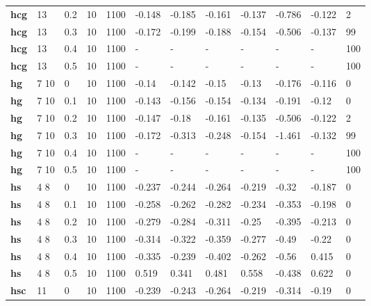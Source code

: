 \begin{longtable}[h]{|p{0.8cm}|p{1.5cm}|p{1cm}|p{1cm}|p{1cm}|p{1cm}|p{1cm}|p{1cm}|p{1cm}|p{1cm}|p{1cm}|p{1.5cm}|}
           \\
  \textbf{hcg } &  13         & 0.2 & 10 & 1100 & -0.148 & -0.185 & -0.161 & -0.137 & -0.786 & -0.122 &   2
           \\
  \textbf{hcg } &  13         & 0.3 & 10 & 1100 & -0.172 & -0.199 & -0.188 & -0.154 & -0.506 & -0.137 &  99
           \\
  \textbf{hcg } &  13         & 0.4 & 10 & 1100 & - & - & - & - & - & - & 100
           \\
  \textbf{hcg } &  13         & 0.5 & 10 & 1100 & - & - & - & - & - & - & 100
           \\
  \textbf{hg  } &  7 10       &   0 & 10 & 1100 &  -0.14 & -0.142 &  -0.15 &  -0.13 & -0.176 & -0.116 &   0
           \\
  \textbf{hg  } &  7 10       & 0.1 & 10 & 1100 & -0.143 & -0.156 & -0.154 & -0.134 & -0.191 &  -0.12 &   0
           \\
  \textbf{hg  } &  7 10       & 0.2 & 10 & 1100 & -0.147 &  -0.18 & -0.161 & -0.135 & -0.506 & -0.122 &   2
           \\
  \textbf{hg  } &  7 10       & 0.3 & 10 & 1100 & -0.172 & -0.313 & -0.248 & -0.154 & -1.461 & -0.132 &  99
           \\
  \textbf{hg  } &  7 10       & 0.4 & 10 & 1100 & - & - & - & - & - & - & 100
           \\
  \textbf{hg  } &  7 10       & 0.5 & 10 & 1100 & - & - & - & - & - & - & 100
           \\
  \textbf{hs  } &  4 8        &   0 & 10 & 1100 & -0.237 & -0.244 & -0.264 & -0.219 &  -0.32 & -0.187 &   0
           \\
  \textbf{hs  } &  4 8        & 0.1 & 10 & 1100 & -0.258 & -0.262 & -0.282 & -0.234 & -0.353 & -0.198 &   0
           \\
  \textbf{hs  } &  4 8        & 0.2 & 10 & 1100 & -0.279 & -0.284 & -0.311 &  -0.25 & -0.395 & -0.213 &   0
           \\
  \textbf{hs  } &  4 8        & 0.3 & 10 & 1100 & -0.314 & -0.322 & -0.359 & -0.277 &  -0.49 &  -0.22 &   0
           \\
  \textbf{hs  } &  4 8        & 0.4 & 10 & 1100 & -0.335 & -0.239 & -0.402 & -0.262 &  -0.56 &  0.415 &   0
           \\
  \textbf{hs  } &  4 8        & 0.5 & 10 & 1100 &  0.519 &  0.341 &  0.481 &  0.558 & -0.438 &  0.622 &   0
           \\
  \textbf{hsc } &  11         &   0 & 10 & 1100 & -0.239 & -0.243 & -0.264 & -0.219 & -0.314 &  -0.19 &   0

\end{longtable}
